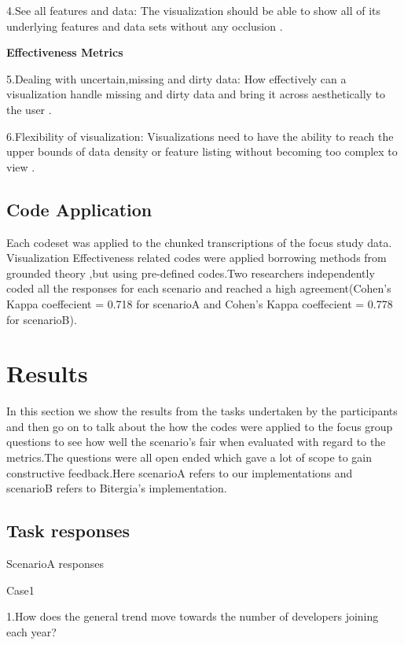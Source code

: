 \documentclass[double,12pt]{beavtex}
\begin{document}
4.See all features and data: The visualization should be able to show all of its underlying features and data sets without any occlusion \cite{grins2001}.

\textbf{Effectiveness Metrics}

5.Dealing with uncertain,missing and dirty data: How effectively can a visualization handle missing and dirty data and bring it across aesthetically to the user \cite{grins2001}.

6.Flexibility of visualization: Visualizations need to have the ability to reach the upper bounds of data density or feature listing without becoming too complex to view \cite{grins2001}.

\section{Code Application}
Each codeset was applied to the chunked transcriptions of the focus study data. Visualization Effectiveness related  codes  were  applied borrowing methods from  grounded theory \cite{corbin2008},but using pre-­defined codes.Two researchers independently coded all the responses for each scenario and reached a high agreement(Cohen’s  Kappa  coeffecient  =  0.718 for scenarioA and Cohen’s  Kappa  coeffecient  =  0.778 for scenarioB).

\chapter{Results}
In this section we show the results from the tasks undertaken by the participants and then go on to talk about the how the codes were applied to the focus group questions to see how well the scenario's fair when evaluated with regard to the metrics.The questions were all open ended which gave a lot of scope to gain constructive feedback.Here scenarioA refers to our implementations and scenarioB refers to Bitergia's implementation.

\section{Task responses}

ScenarioA responses

Case1

1.How does the general trend move towards the number of developers joining each year?
\end{document}
